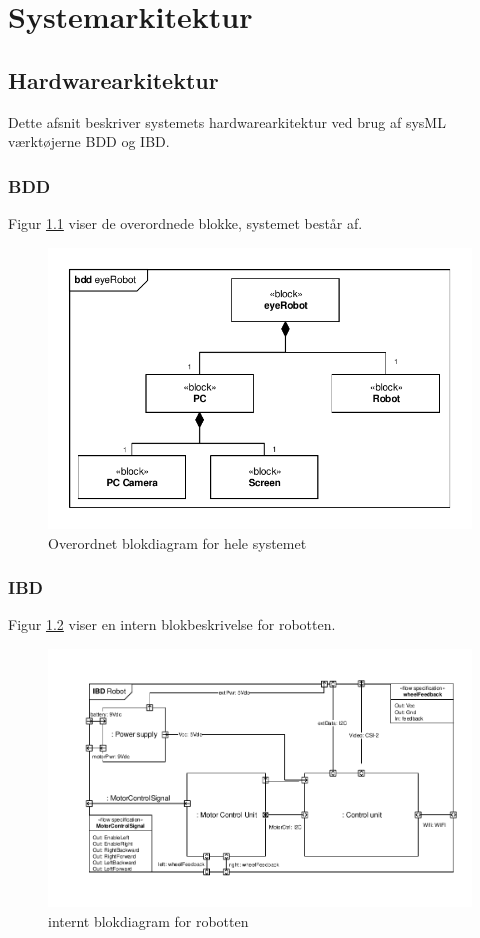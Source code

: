 %
%
	
\chapter{Systemarkitektur}

\section{Hardwarearkitektur}
Dette afsnit beskriver systemets hardwarearkitektur ved brug af sysML værktøjerne BDD og IBD. 

\subsection{BDD}
Figur \ref{fig:BDD_system} viser de overordnede blokke, systemet består af.
\begin{figure} [H]
	\centering
	\includegraphics[clip, trim = 0cm 0cm 0cm 0.5cm ,width = 0.7 \textwidth]{figur/BDD_eyeRobot.pdf}
	\caption{Overordnet blokdiagram for hele systemet}
	\label{fig:BDD_system}
\end{figure}
\newpage

\subsection{IBD}
Figur \ref{fig:IBD_robot} viser en intern blokbeskrivelse for robotten.
\begin{figure}[H]
	\centering
	\includegraphics[clip, trim = 0.5cm 0.5cm 0.5cm 1cm ,width = \textwidth]{figur/IBD_robot.pdf}
	\caption{internt blokdiagram for robotten}
	\label{fig:IBD_robot}
\end{figure}


